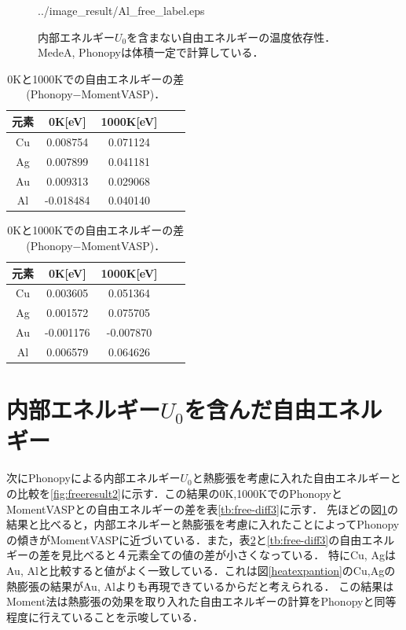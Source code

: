 \begin{figure}[htbp]
\begin{minipage}[b]{0.5\linewidth}
  {../image_result/Al_free_label.eps}
  \label{free4}
 \end{minipage}
 \caption{内部エネルギー$U_0$を含まない自由エネルギーの温度依存性．MedeA, Phonopyは体積一定で計算している．}\label{fig:freeresult}
\end{figure}



\begin{table}[htbp]
  \begin{minipage}[b]{0.48\linewidth}
  \centering
  \caption{0Kと1000Kでの自由エネルギーの差(MedeA$-$MomentVASP)．}
  \label{tb:free-diff}
  \begin{tabular}{ccccc}\hline
    元素 & 0K[eV] & 1000K[eV] \\ \hline \hline
    Cu & 0.008754 & 0.071124 \\
    Ag & 0.007899 & 0.041181\\
    Au & 0.009313 & 0.029068\\
    Al & -0.018484 & 0.040140\\ \hline
  \end{tabular}
 \end{minipage}
 \hspace{0.04\linewidth}
 \begin{minipage}[b]{0.48\linewidth}
 \caption{0Kと1000Kでの自由エネルギーの差(Phonopy$-$MomentVASP)．}
 \label{tb:free-diff2}
  \centering
  \begin{tabular}{ccccc}\hline
    元素 & 0K[eV] & 1000K[eV] \\ \hline \hline
    Cu & 0.003605 & 0.051364  \\
    Ag & 0.001572 & 0.075705 \\
    Au & -0.001176 & -0.007870 \\
    Al & 0.006579 & 0.064626 \\ \hline
  \end{tabular}
 \end{minipage}
\end{table}




\section{内部エネルギー$U_0$を含んだ自由エネルギー}
次にPhonopyによる内部エネルギー$U_0$と熱膨張を考慮に入れた自由エネルギーとの比較を\ref{fig:freeresult2}に示す．この結果の0K,1000KでのPhonopyとMomentVASPとの自由エネルギーの差を表\ref{tb:free-diff3}に示す．
先ほどの図\ref{fig:freeresult}の結果と比べると，内部エネルギーと熱膨張を考慮に入れたことによってPhonopyの傾きがMomentVASPに近づいている．また，表\ref{tb:free-diff2}と\ref{tb:free-diff3}の自由エネルギーの差を見比べると４元素全ての値の差が小さくなっている．
特にCu, AgはAu, Alと比較すると値がよく一致している．これは図\ref{heatexpantion}のCu,Agの熱膨張の結果がAu, Alよりも再現できているからだと考えられる．
この結果はMoment法は熱膨張の効果を取り入れた自由エネルギーの計算をPhonopyと同等程度に行えていることを示唆している．

